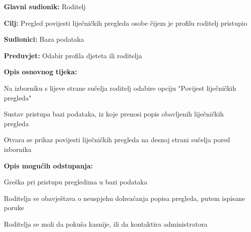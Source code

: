 					\noindent {}
					\begin{packed_item}
						
						\item \textbf{Glavni sudionik: }Roditelj
						\item  \textbf{Cilj:} Pregled povijesti liječničkih pregleda osobe čijem je profilu roditelj pristupio
						\item  \textbf{Sudionici:} Baza podataka
						\item  \textbf{Preduvjet:} Odabir profila djeteta ili roditelja
						\item  \textbf{Opis osnovnog tijeka:}
						
						\item[] \begin{packed_enum}
							
							\item Na izborniku s lijeve strane sučelja roditelj odabire opciju "Povijest liječničkih pregleda"
							\item Sustav pristupa bazi podataka, iz koje prenosi popis obavljenih liječničkih pregleda
							\item Otvara se prikaz povijesti liječničkih pregleda na desnoj strani sučelja pored izbornika
						\end{packed_enum}
						\item  \textbf{Opis mogućih odstupanja:}
						\item[] \begin{packed_item}
							
							\item[2.a] Greška pri pristupu pregledima u bazi podataka
							\item[] \begin{packed_enum}
								
								\item Roditelja se obavještava o neuspjehu dohvaćanja popisa pregleda, putem ispisane poruke
								\item Roditelja se moli da pokuša kasnije, ili da kontaktira administratora
								
							\end{packed_enum}
						\end{packed_item}
					\end{packed_item}
					
